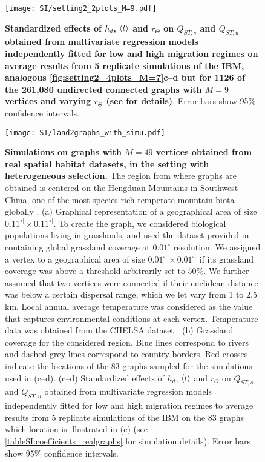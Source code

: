 \begin{figure}[ht]
  \centerline{
      \texttt{[image: SI/setting2\_2plots\_M=9.pdf]} 
  }
  \caption{\textbf{Standardized effects of $h_d$, $\langle l \rangle$ and $r_\Theta$ on $Q_{ST,s}$ and $Q_{ST,u}$ obtained from multivariate regression models independently fitted for low and high migration regimes on average results from 5 replicate simulations of the IBM, analogous \cref{fig:setting2_4plots_M=7}c--d but for 1126 of the 261,080 undirected connected graphs with $M=9$ vertices and varying $r_\Theta$ (see  for details)}. Error bars show 95\% confidence intervals.
}
  \label{figSI:setting2_2plots_M=9}
\end{figure}

\begin{figure}[!ht]
  \centerline{
      \texttt{[image: SI/land2graphs\_with\_simu.pdf]} 
  }
  \caption{\small \textbf{Simulations on graphs with $M=49$ vertices obtained from real spatial habitat datasets, in the setting with heterogeneous selection.} The region from where graphs are obtained is centered on the Hengduan Mountains in Southwest China, one of the most species-rich temperate mountain biota globally \citep{Ding2020a}.
  (a) Graphical representation of a geographical area of size $ 0.11^{\circ|} \times 0.11^{\circ|}$. To create the graph, we considered biological populations living in grasslands, and used the dataset provided in \citep{Jung2020} containing global grassland coverage at $0.01^\circ$ resolution. We assigned a vertex to a geographical area of size $ 0.01^{\circ|} \times 0.01^{\circ|}$ if its grassland coverage was above a threshold arbitrarily set to $50\%$. We further assumed that two vertices were connected if their euclidean distance was below a certain dispersal range, which we let vary from 1 to 2.5 km. Local annual average temperature was considered as the value that captures environmental conditions at each vertex. Temperature data was obtained from the CHELSA dataset \citep{Karger2017}.
  (b) Grassland coverage for the considered region. Blue lines correspond to rivers and dashed grey lines correspond to country borders. Red crosses indicate the locations of the 83 graphs sampled for the simulations used in (c--d).
  (c--d) Standardized effects of $h_d$, $\langle l \rangle$ and $r_\Theta$ on $Q_{ST,s}$ and $Q_{ST,u}$ obtained from multivariate regression models independently fitted for low and high migration regimes to average results from 5 replicate simulations of the IBM on the 83 graphs which location is illustrated in (c) (see \cref{tableSI:coefficients_realgraphs} for simulation details). Error bars show 95\% confidence intervals.}
  \label{figSI:graph_real_land}
\end{figure}

